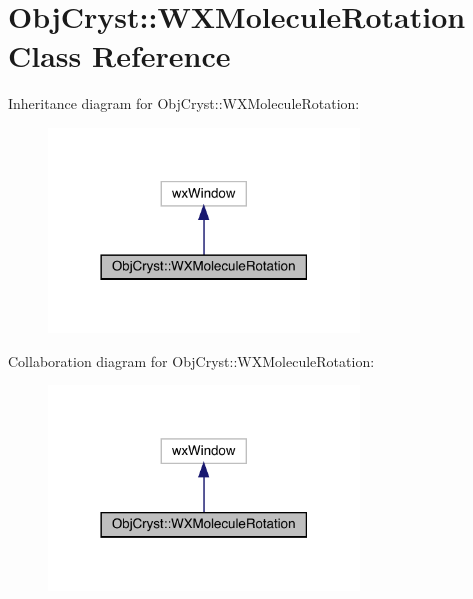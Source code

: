 \hypertarget{class_obj_cryst_1_1_w_x_molecule_rotation}{}\section{Obj\+Cryst\+::W\+X\+Molecule\+Rotation Class Reference}
\label{class_obj_cryst_1_1_w_x_molecule_rotation}


Inheritance diagram for Obj\+Cryst\+::W\+X\+Molecule\+Rotation\+:
\nopagebreak
\begin{figure}[H]
\begin{center}
\leavevmode
\includegraphics[width=234pt]{class_obj_cryst_1_1_w_x_molecule_rotation__inherit__graph}
\end{center}
\end{figure}


Collaboration diagram for Obj\+Cryst\+::W\+X\+Molecule\+Rotation\+:
\nopagebreak
\begin{figure}[H]
\begin{center}
\leavevmode
\includegraphics[width=234pt]{class_obj_cryst_1_1_w_x_molecule_rotation__coll__graph}
\end{center}
\end{figure}
